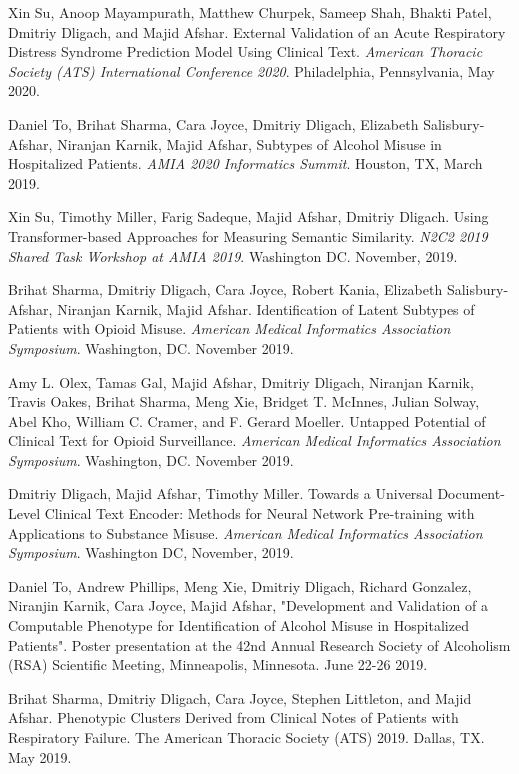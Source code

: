 \documentclass[letterpaper]{article}
\renewenvironment{itemize}{
  \begin{list}{}{
    \setlength{\leftmargin}{1.5em}
  }
}{
  \end{list}
}
\begin{document}
\begin{itemize}
\item Xin Su, Anoop Mayampurath, Matthew Churpek, Sameep Shah, Bhakti Patel, Dmitriy Dligach, and Majid Afshar. External Validation of an Acute Respiratory Distress Syndrome Prediction Model Using Clinical Text. \emph{American Thoracic Society (ATS) International Conference 2020}. Philadelphia, Pennsylvania, May 2020.
\item Daniel To, Brihat Sharma, Cara Joyce, Dmitriy Dligach, Elizabeth Salisbury-Afshar, Niranjan Karnik, Majid Afshar, Subtypes of Alcohol Misuse in Hospitalized Patients. \emph{AMIA 2020 Informatics Summit}. Houston, TX, March 2019.
\item Xin Su, Timothy Miller, Farig Sadeque, Majid Afshar, Dmitriy Dligach. Using Transformer-based Approaches for Measuring Semantic Similarity. \emph{N2C2 2019 Shared Task Workshop at AMIA 2019}. Washington DC. November, 2019.
\item Brihat Sharma, Dmitriy Dligach, Cara Joyce, Robert Kania, Elizabeth Salisbury-Afshar, Niranjan Karnik, Majid Afshar. Identification of Latent Subtypes of Patients with Opioid Misuse. \emph{American Medical Informatics Association Symposium}. Washington, DC. November 2019.
\item Amy L. Olex, Tamas Gal, Majid Afshar, Dmitriy Dligach, Niranjan Karnik, Travis Oakes, Brihat Sharma, Meng Xie, Bridget T. McInnes, Julian Solway, Abel Kho, William C. Cramer, and F. Gerard Moeller. Untapped Potential of Clinical Text for Opioid Surveillance. \emph{American Medical Informatics Association Symposium}. Washington, DC. November 2019.
\item Dmitriy Dligach, Majid Afshar, Timothy Miller. Towards a Universal Document-Level Clinical Text Encoder: Methods for Neural Network Pre-training with Applications to Substance Misuse. \emph{American Medical Informatics Association Symposium}. Washington DC, November, 2019.
\item Daniel To, Andrew Phillips, Meng Xie, Dmitriy Dligach, Richard Gonzalez, Niranjin Karnik, Cara Joyce, Majid Afshar, "Development and Validation of a Computable Phenotype for Identification of Alcohol Misuse in Hospitalized Patients". Poster presentation at the 42nd Annual Research Society of Alcoholism (RSA) Scientific Meeting, Minneapolis, Minnesota. June 22-26 2019.
\item Brihat Sharma, Dmitriy Dligach, Cara Joyce, Stephen Littleton, and Majid Afshar. Phenotypic Clusters Derived from Clinical Notes of Patients with Respiratory Failure. The American Thoracic Society (ATS) 2019. Dallas, TX. May 2019.

\end{itemize}
\end{document}
